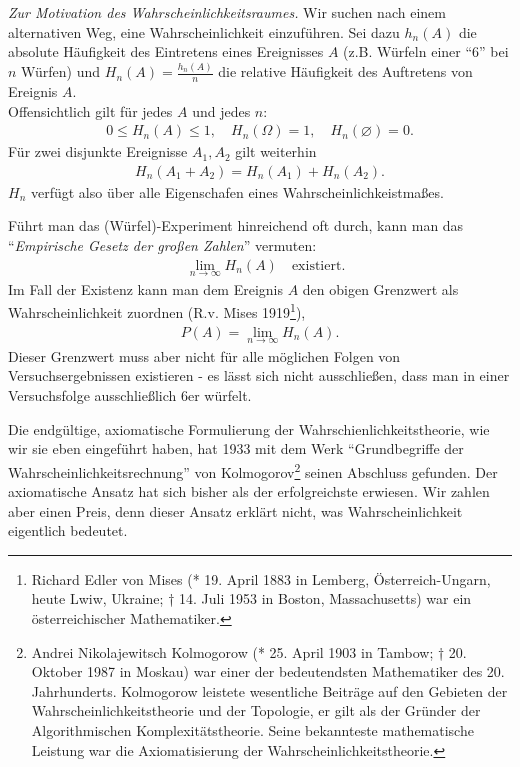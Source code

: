 \textit{Zur Motivation des Wahrscheinlichkeitsraumes.} Wir suchen nach einem
alternativen Weg, eine Wahrscheinlichkeit einzuführen. Sei dazu $h_n(A)$ die
absolute Häufigkeit des Eintretens eines Ereignisses $A$ (z.B. Würfeln einer
``6'' bei $n$ Würfen) und $H_n(A) = \frac{h_n(A)}{n}$ die relative Häufigkeit
des Auftretens von Ereignis $A$.\\ Offensichtlich gilt für jedes $A$ und jedes
$n$:
\begin{align*}
0\le H_n(A) \le 1,\quad  H_n(\Omega) = 1,\quad  H_n(\varnothing) = 0.
\end{align*}
Für zwei disjunkte Ereignisse $A_1,A_2$ gilt weiterhin
\begin{align*}
H_n(A_1+A_2) = H_n(A_1)+H_n(A_2).
\end{align*}
$H_n$ verfügt also über alle Eigenschafen eines Wahrscheinlichkeistmaßes.

Führt man das (Würfel)-Experiment hinreichend oft durch, kann man das
``\emph{Empirische Gesetz der großen Zahlen}'' vermuten:
\begin{align*}
&\lim\limits_{n\to\infty} H_n(A)\quad\text{existiert}.  
\end{align*}
Im Fall der Existenz kann man dem Ereignis $A$ den obigen Grenzwert als
Wahrscheinlichkeit zuordnen (R.v. Mises 1919\footnote{
Richard Edler von Mises (* 19. April 1883 in Lemberg, Österreich-Ungarn, heute
Lwiw, Ukraine; † 14. Juli 1953 in Boston, Massachusetts) war ein
österreichischer Mathematiker.
}),
\begin{align*}
P(A) = \lim\limits_{n\to\infty} H_n(A).
\end{align*}
Dieser Grenzwert muss aber nicht für alle
möglichen Folgen von Versuchsergebnissen existieren - es lässt sich nicht
ausschließen, dass man in einer Versuchsfolge ausschließlich 6er würfelt.

Die endgültige, axiomatische Formulierung der Wahrschienlichkeitstheorie, wie
wir sie eben eingeführt haben, hat 1933 mit dem Werk ``Grundbegriffe der
Wahrscheinlichkeitsrechnung'' von Kolmogorov\footnote{
Andrei Nikolajewitsch Kolmogorow (* 25. April 1903
in Tambow; † 20. Oktober 1987 in Moskau) war einer der bedeutendsten
Mathematiker des 20. Jahrhunderts. 
Kolmogorow leistete wesentliche Beiträge auf den Gebieten der
Wahrscheinlichkeitstheorie und der Topologie, er gilt als der Gründer der
Algorithmischen Komplexitätstheorie. Seine bekannteste mathematische Leistung
war die Axiomatisierung der Wahrscheinlichkeitstheorie.}
seinen Abschluss gefunden. Der axiomatische Ansatz hat sich bisher als der erfolgreichste erwiesen. Wir zahlen aber einen Preis, denn dieser Ansatz erklärt nicht, was Wahrscheinlichkeit eigentlich
bedeutet.

